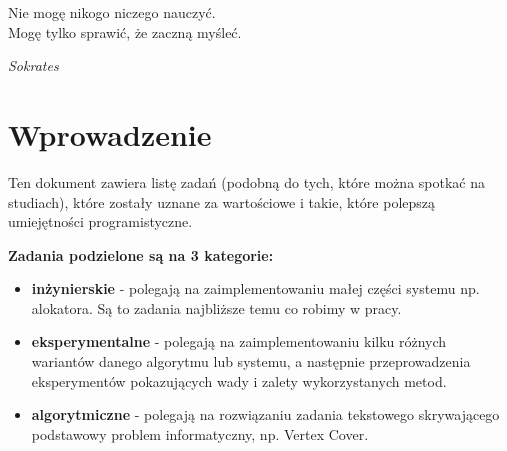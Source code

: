 \epigraph{Nie mogę nikogo niczego nauczyć. \\ Mogę tylko sprawić, że zaczną myśleć.}{\textit{Sokrates}}
\section{Wprowadzenie}

Ten dokument zawiera listę zadań (podobną do tych, które można spotkać na studiach), które zostały uznane za wartościowe i takie, które polepszą umiejętności programistyczne.

\textbf{Zadania podzielone są na 3 kategorie:}
\begin{itemize}
    \item \textbf{inżynierskie} - polegają na zaimplementowaniu małej części systemu np. alokatora. Są to zadania najbliższe temu co robimy w pracy.
    \item \textbf{eksperymentalne} - polegają na zaimplementowaniu kilku różnych wariantów danego algorytmu lub systemu, a następnie przeprowadzenia eksperymentów pokazujących wady i zalety wykorzystanych metod.
    \item \textbf{algorytmiczne} - polegają na rozwiązaniu zadania tekstowego skrywającego podstawowy problem informatyczny, np. Vertex Cover.
\end{itemize}


